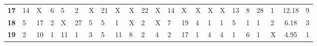 \begin{table}[t]
\begin{adjustbox}{width=\textwidth}
\begin{tabular}{|c|llllllllllllllllllll|c|c|}
\textbf{17}          & {\color{blue} 14} & {\color{red} X} & {\color{blue} 6}                      & {\color{blue} 5}                      & {\color{blue} 2}                      & {\color{red} X} & {\color{blue} 21} & {\color{red} X} & {\color{red} X} & {\color{blue} 22}                     & {\color{red} X} & {\color{blue} 14}                     & {\color{red} X} & {\color{red} X} & {\color{red} X} & {\color{red} X} & {\color{blue} 13}                     & {\color{blue} 8}                      & {\color{blue} 28}                     & {\color{blue} 1}                      & 12.18                                               & 9                                                   \\
\textbf{18}          & {\color{blue} 5}  & {\color{blue} 17}                     & {\color{blue} 2}                      & {\color{red} X} & {\color{blue} 27}                     & {\color{blue} 5}                      & {\color{blue} 5}  & {\color{blue} 1}                      & {\color{red} X} & {\color{blue} 2}                      & {\color{red} X} & {\color{blue} 7}                      & {\color{blue} 19}                     & {\color{blue} 4}                      & {\color{blue} 1}                      & {\color{blue} 1}                      & {\color{blue} 5}                      & {\color{blue} 1}                      & {\color{blue} 1}                      & {\color{blue} 2}                      & 6.18                                                & 3                                                   \\
\textbf{19}          & {\color{blue} 2}  & {\color{blue} 10}                     & {\color{blue} 1}                      & {\color{blue} 11}                     & {\color{blue} 1}                      & {\color{blue} 3}                      & {\color{blue} 5}  & {\color{blue} 11}                     & {\color{blue} 8}                      & {\color{blue} 2}                      & {\color{blue} 4}                      & {\color{blue} 2}                      & {\color{blue} 17}                     & {\color{blue} 1}                      & {\color{blue} 4}                      & {\color{blue} 4}                      & {\color{blue} 1}                      & {\color{blue} 6}                      & {\color{blue} 1}                      & {\color{red} X} & 4.95                                                & 1                                                   \\

\end{tabular}
\end{adjustbox}
\end{table}
